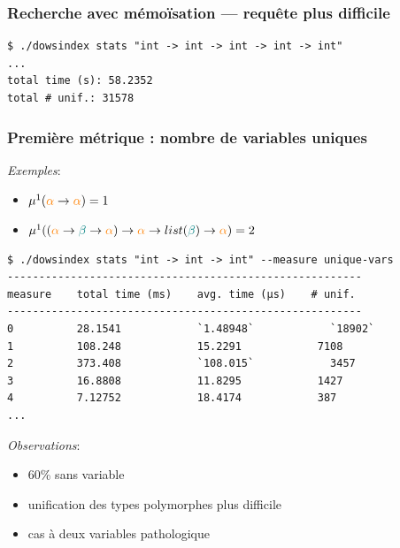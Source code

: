 \documentclass[serif]{beamer}
\newcommand{\exemples}{\textit{Exemples}\xspace}
\newcommand{\observations}{\textit{Observations}\xspace}
\begin{document}

\begin{frame}[fragile=singleslide]\frametitle{Recherche avec mémoïsation — requête plus difficile}
\begin{verbatim}
$ ./dowsindex stats "int -> int -> int -> int -> int"
...
total time (s): 58.2352
total # unif.: 31578
\end{verbatim}
\end{frame}


\begin{frame}[fragile=singleslide]\frametitle{Première métrique : nombre de variables uniques}
\scriptsize
\exemples :
\begin{itemize}
  \item $\mu^1 (\textcolor{orange}{\alpha} \rightarrow \textcolor{orange}{\alpha}) = 1$
  \item $\mu^1 ((\textcolor{orange}{\alpha} \rightarrow \textcolor{teal}{\beta} \rightarrow \textcolor{orange}{\alpha}) \rightarrow \textcolor{orange}{\alpha} \rightarrow list (\textcolor{teal}{\beta}) \rightarrow \textcolor{orange}{\alpha}) = 2$
\end{itemize}
\bigskip
\begin{lstlisting}
$ ./dowsindex stats "int -> int -> int" --measure unique-vars
--------------------------------------------------------
measure    total time (ms)    avg. time (µs)    # unif.
--------------------------------------------------------
0          28.1541            `1.48948`            `18902`
1          108.248            15.2291            7108
2          373.408            `108.015`            3457
3          16.8808            11.8295            1427
4          7.12752            18.4174            387
...
\end{lstlisting}
\observations :
\begin{itemize}
  \item 60\% sans variable
  \item unification des types polymorphes plus difficile
  \item cas à deux variables pathologique
\end{itemize}
\end{frame}

\end{document}

